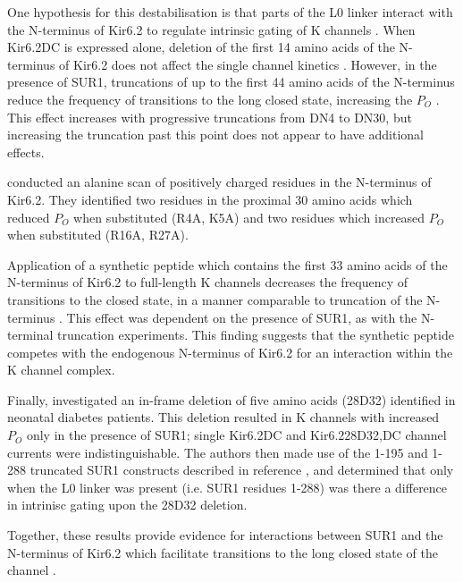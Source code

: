 One hypothesis for this destabilisation is that parts of the L0 linker interact with the N-terminus of Kir6.2 to regulate intrinsic gating of K\ATP{} channels \cite{koster_atp_1999, babenko_n-terminus_1999, reimann_involvement_1999-1, babenko_sur-dependent_2002}.
When Kir6.2\textgreek{D}C is expressed alone, deletion of the first 14 amino acids of the N-terminus of Kir6.2 does not affect the single channel kinetics \cite{reimann_involvement_1999-1}.
However, in the presence of SUR1, truncations of up to the first 44 amino acids of the N-terminus reduce the frequency of transitions to the long closed state, increasing the $P_O$ \cite{reimann_involvement_1999-1, koster_atp_1999, babenko_n-terminus_1999}.
This effect increases with progressive truncations from \textgreek{D}N4 to \textgreek{D}N30, but increasing the truncation past this point does not appear to have additional effects.

\citeauthor{cukras_role_2002} conducted an alanine scan of positively charged residues in the N-terminus of Kir6.2.
They identified two residues in the proximal 30 amino acids which reduced $P_O$ when substituted (R4A, K5A) and two residues which increased $P_O$ when substituted (R16A, R27A).

Application of a synthetic peptide which contains the first 33 amino acids of the N-terminus of Kir6.2 to full-length K\ATP{} channels decreases the frequency of transitions to the closed state, in a manner comparable to truncation of the N-terminus \cite{babenko_sur-dependent_2002}.
This effect was dependent on the presence of SUR1, as with the N-terminal truncation experiments.
This finding suggests that the synthetic peptide competes with the endogenous N-terminus of Kir6.2 for an interaction within the K\ATP{} channel complex.

Finally, \citeauthor{craig_-frame_2009} investigated an in-frame deletion of five amino acids (28\textgreek{D}32) identified in neonatal diabetes patients.
This deletion resulted in K\ATP{} channels with increased $P_O$ only in the presence of SUR1; single Kir6.2\textgreek{D}C and Kir6.228\textgreek{D}32,\textgreek{D}C channel currents were indistinguishable.
The authors then made use of the 1-195 and 1-288 truncated SUR1 constructs described in reference \cite{babenko_sur_2003}, and determined that only when the L0 linker was present (i.e. SUR1 residues 1-288) was there a difference in intrinisc gating upon the 28\textgreek{D}32 deletion.

Together, these results provide evidence for interactions between SUR1 and the N-terminus of Kir6.2 which facilitate transitions to the long closed state of the channel \cite{babenko_sur_2003}.

